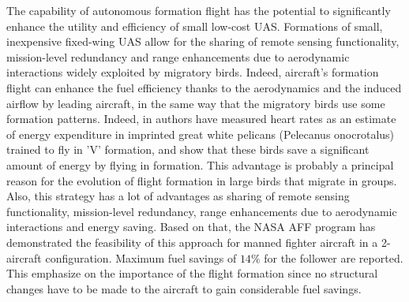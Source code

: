 \documentclass{ifacconf}
\begin{document}
The capability of autonomous formation flight has the potential to significantly enhance the utility and efficiency of small low-cost UAS. Formations of small, inexpensive fixed-wing UAS allow for the sharing of remote sensing functionality, mission-level redundancy and range enhancements due to aerodynamic interactions widely exploited by migratory birds. Indeed, aircraft's formation flight can enhance the fuel efficiency thanks to the aerodynamics and the induced airflow by leading aircraft, in the same way that the migratory birds use some formation patterns. Indeed, in \cite{weimerskirch2001energy} authors  have measured heart rates as an estimate of energy expenditure in imprinted great white pelicans (Pelecanus onocrotalus) trained to fly in 'V' formation, and show that these birds save a significant amount of energy by flying in formation. This advantage is probably a principal reason for the evolution of flight formation in large birds that migrate in groups.\\
 Also, this strategy has a lot of advantages as sharing of remote sensing functionality, mission-level redundancy, range enhancements due to aerodynamic interactions and energy saving. Based on that, the NASA AFF program has demonstrated the feasibility of this approach for manned fighter aircraft in a 2-aircraft configuration. Maximum fuel savings of $14\%$ for the follower are reported. This emphasize on the importance of the flight formation since no structural changes have to be made to the aircraft to gain considerable fuel savings.\\
\end{document}
